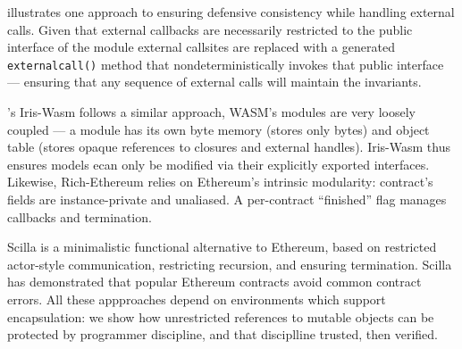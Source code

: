 \citet{CassezFQ24} illustrates one approach to ensuring defensive
consistency while handling external calls.
Given that 
external callbacks
are
necessarily restricted to the public interface of the module
external callsites are replaced 
with a
generated \texttt{externalcall()} method that 
nondeterministically invokes
%
that 
public
interface ---
ensuring that any 
sequence of external calls will maintain the
invariants.


\citet{iris-wasm-pldi2023}'s Iris-Wasm follows a similar approach,
WASM's
modules are very loosely coupled --- a module
has its own byte memory
(stores only bytes) 
and object table
(stores opaque references to closures and external handles).
%
%
Iris-Wasm thus ensures models 
ecan only be
modified via their explicitly exported interfaces.
%
Likewise, Rich-Ethereum \cite{rich-specs-smart-contracts-oopsla2021}
relies on Ethereum's intrinsic modularity:
contract's fields are instance-private
and unaliased.
A per-contract ``finished'' flag
manages callbacks and termination.
%


Scilla \cite{sergey-scilla-oopsla2019}
is a minimalistic functional alternative to Ethereum,
based on restricted actor-style
communication, restricting recursion, and ensuring termination.
Scilla has demonstrated that popular Ethereum
contracts avoid common contract errors.
%
All these appproaches depend on
environments which support encapsulation:
we show how unrestricted references to mutable objects can be protected
by programmer discipline,
and that disciplline trusted, then verified.

